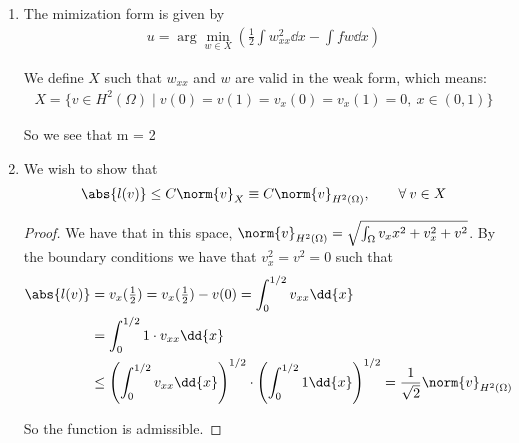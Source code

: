 \begin{enumerate}[label=(\alph*),leftmargin=*,itemsep=0mm]
    \item The mimization form is given by
    \begin{align}
        u = \arg\min_{w\in X}\left( \frac{1}{2}\int w_{xx}^2 \dd{x} - \int fw \dd{x} \right)
    \end{align}
    
    We define $X$ such that $w_{xx}$ and $w$ are valid in the weak form, which means:
    \begin{align}
        X = \{ v\in H^2(\Omega) \mid v(0) = v(1) = v_x(0) = v_x(1) = 0, \> x \in (0,1) \}
    \end{align}
    
    So we see that m = 2
    
    \item We wish to show that 
    \begin{align*}
        \abs{l(v)} \leq C\norm{v}_X \equiv C\norm{v}_{H^2(\Omega)}, \qquad \forall \> v\in X
    \end{align*}
    
    \begin{proof}
        We have that in this space, $\norm{v}_{H^2(\Omega)} = \sqrt{\int_\Omega v_xx^2 + v_x^2 + v^2}$.  By the boundary conditions we have that $v_x^2 = v^2 = 0$ such that
        \begin{align*}
            \abs{l(v)} &= v_x(\tfrac{1}{2}) = v_x(\tfrac{1}{2}) - v(0) = \int_0^{1/2} v_{xx} \dd{x} \\
            &= \int_0^{1/2} 1 \cdot v_{xx} \dd{x} \\
            &\leq \left( \int_0^{1/2} v_{xx} \dd{x}\right)^{1/2}
            \cdot \left( \int_0^{1/2} 1 \dd{x} \right)^{1/2}
            = \frac{1}{\sqrt{2}} \norm{v}_{H^2(\Omega)}
        \end{align*}
        
        So the function is admissible.
    \end{proof}
    
\end{enumerate}